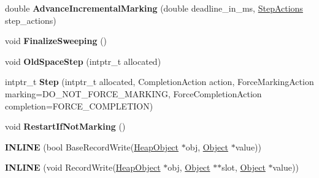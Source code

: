 \begin{DoxyCompactItemize}
\item 
double {\bfseries Advance\+Incremental\+Marking} (double deadline\+\_\+in\+\_\+ms, \hyperlink{structv8_1_1internal_1_1_incremental_marking_1_1_step_actions}{Step\+Actions} step\+\_\+actions)\hypertarget{classv8_1_1internal_1_1_incremental_marking_aa0b783e8af4287953f3888a4e15fb0a7}{}\label{classv8_1_1internal_1_1_incremental_marking_aa0b783e8af4287953f3888a4e15fb0a7}

\item 
void {\bfseries Finalize\+Sweeping} ()\hypertarget{classv8_1_1internal_1_1_incremental_marking_a046c867da14b0d0c24adf418275e9b10}{}\label{classv8_1_1internal_1_1_incremental_marking_a046c867da14b0d0c24adf418275e9b10}

\item 
void {\bfseries Old\+Space\+Step} (intptr\+\_\+t allocated)\hypertarget{classv8_1_1internal_1_1_incremental_marking_a26eb27235983b7859e8a20c3bc4cb533}{}\label{classv8_1_1internal_1_1_incremental_marking_a26eb27235983b7859e8a20c3bc4cb533}

\item 
intptr\+\_\+t {\bfseries Step} (intptr\+\_\+t allocated, Completion\+Action action, Force\+Marking\+Action marking=D\+O\+\_\+\+N\+O\+T\+\_\+\+F\+O\+R\+C\+E\+\_\+\+M\+A\+R\+K\+I\+NG, Force\+Completion\+Action completion=F\+O\+R\+C\+E\+\_\+\+C\+O\+M\+P\+L\+E\+T\+I\+ON)\hypertarget{classv8_1_1internal_1_1_incremental_marking_a42cf591a56ceef0eba50481b56fa835b}{}\label{classv8_1_1internal_1_1_incremental_marking_a42cf591a56ceef0eba50481b56fa835b}

\item 
void {\bfseries Restart\+If\+Not\+Marking} ()\hypertarget{classv8_1_1internal_1_1_incremental_marking_a704af5ad518fd3c4e751a1f286b8e89d}{}\label{classv8_1_1internal_1_1_incremental_marking_a704af5ad518fd3c4e751a1f286b8e89d}

\item 
{\bfseries I\+N\+L\+I\+NE} (bool Base\+Record\+Write(\hyperlink{classv8_1_1internal_1_1_heap_object}{Heap\+Object} $\ast$obj, \hyperlink{classv8_1_1internal_1_1_object}{Object} $\ast$value))\hypertarget{classv8_1_1internal_1_1_incremental_marking_ab4398c0f9d1e2dbd94e4479e79389bfe}{}\label{classv8_1_1internal_1_1_incremental_marking_ab4398c0f9d1e2dbd94e4479e79389bfe}

\item 
{\bfseries I\+N\+L\+I\+NE} (void Record\+Write(\hyperlink{classv8_1_1internal_1_1_heap_object}{Heap\+Object} $\ast$obj, \hyperlink{classv8_1_1internal_1_1_object}{Object} $\ast$$\ast$slot, \hyperlink{classv8_1_1internal_1_1_object}{Object} $\ast$value))\hypertarget{classv8_1_1internal_1_1_incremental_marking_ae4eed763dd9f702ab4c9663979baa06c}{}\label{classv8_1_1internal_1_1_incremental_marking_ae4eed763dd9f702ab4c9663979baa06c}


\end{DoxyCompactItemize}

